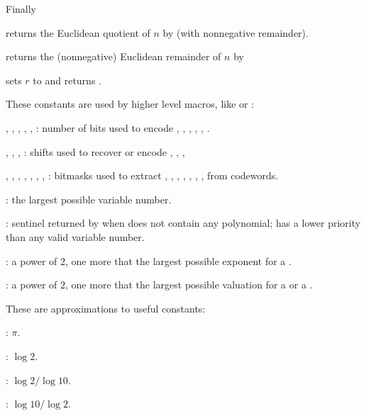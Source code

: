 \noindent Finally

 returns the Euclidean quotient of $n$ by
 (with nonnegative remainder).

 returns the (nonnegative) Euclidean remainder of $n$
by 


 sets $r$ to 
and returns .


These constants are used by higher level macros, like  or :

\noindent {},
,
,
,
,
:
number of bits used to encode , , ,
, , .

\noindent {},
,
,
: shifts used to recover or encode , ,
, 

\noindent {},
,
,
,
,
,
,
: bitmasks used to extract , , ,
, , , ,  from 
codewords.

\noindent {}: the largest possible variable number.

\noindent {}:  sentinel returned by  when 
does not contain any polynomial; has a lower priority than any valid variable
number.

\noindent {}: a power of $2$, one more that the largest possible
exponent for a .

\noindent {}: a power of $2$, one more that the largest possible
valuation for a  or a .


These are  approximations to useful constants:

\noindent {}: $\pi$.

\noindent {}: $\log 2$.

\noindent {}: $\log 2 / \log 10$.

\noindent {}: $\log 10 / \log 2$.

